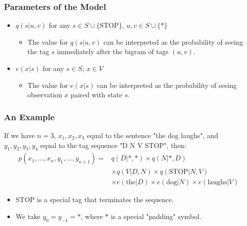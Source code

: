 \documentclass[handout]{beamer}
\begin{document}
\begin{frame}
  \frametitle{Parameters of the Model}
  \begin{itemize}
    \item $q(s|u, v)$ for any $s \in S \cup \{\text{STOP}\}$, $u, v \in S \cup \{*\}$
    \begin{itemize}
     \item The value for $q(s|u,v)$ can be interpreted as the probability of seeing the tag $s$ immediately after the bigram of tags $(u, v)$.
    \end{itemize}    
    \item $e(x|s)$ for any $s \in S$, $x \in V$ 
    \begin{itemize}
     \item The value for $e(x|s)$ can be interpreted as the probability of seeing observation $x$ paired with state $s$.
    \end{itemize}

    
    
  \end{itemize}
\end{frame}

\begin{frame}
  \frametitle{An Example}
  \scriptsize
  If we have $n = 3$, $x_1, x_2, x_3$ equal to the sentence "the dog laughs", and $y_1, y_2, y_3, y_4$ equal to the tag sequence "D N V STOP", then:
\[
\begin{aligned}
p(x_1, \ldots, x_n, y_1, \ldots, y_{n+1}) = & q(D|*,*) \times q(N|*,D) \\
& \times q(V|D,N) \times q(\text{STOP}|N,V) \\
& \times e(\text{the}|D) \times e(\text{dog}|N) \times e(\text{laughs}|V)
\end{aligned}
\]
  \begin{itemize}
    \item STOP is a special tag that terminates the sequence.
    \item We take $y_0 = y_{-1} = *$, where $*$ is a special "padding" symbol.
  \end{itemize}
\end{frame}
\end{document}
